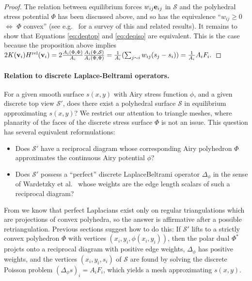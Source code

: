 \documentclass[annual]{acmsiggraph}
\def\rel{{\mathord{\text{\rm rel}}}}
\def\SS{{\mathcal S}}
\begin{document}
\begin{proof} The relation between equilibrium forces $w_{ij}{\mathbf e}_{ij}$ in
$\SS$ and the polyhedral stress potential $\Phi$ has been discussed above,
and so has the equivalence ``$w_{ij}\ge 0$ $\iff$ $\Phi$ convex'' (see
e.g.\ \cite{Ash1988} for a survey of this and related results). It remains
to show that Equations \eqref{eq:deqtop} and \eqref{eq:deqiso} are
equivalent. This is the case because the proposition above implies
	$
	2 K(\vw_i) H^\rel(\vw_i) =
	2 \frac{A_i(\Phi,\Phi)}{A_i}
	\frac{A_i(\Phi,\SS)}{A_i(\Phi,\Phi)} =
	{1\over A_i}
	(\sum_{j\sim i} w_{ij} (s_j-s_i))
	= {1\over A_i} A_i F_i.
	$
	\end{proof}

\paragraph{Relation to discrete Laplace-Beltrami operators.}

For a given smooth surface $s(x,y)$ with Airy stress function $\phi$, and 
a given discrete top view $\SS'$, does there exist a polyhedral surface 
$\SS$ in equilibrium approximating $s(x,y)$? We restrict our attention to 
triangle meshes, where planarity of the faces of the discrete stress 
surface $\Phi$ is not an issue.
This question has several equivalent reformulations:

\begin{itemize}\itemsep-\parsep

\item Does $\SS'$ have a reciprocal diagram whose corresponding
Airy polyhedron $\Phi$ approximates the continuous Airy potential $\phi$?

\item Does $\SS'$ possess a ``perfect'' discrete Laplace\dash Beltrami operator 
$\Delta_\phi$ in the sense of Wardetzky et al.~
whose weights are the edge length scalars of such a reciprocal diagram?

\end{itemize}

From \cite{wardetzky07} we know that perfect Laplacians exist only
on regular triangulations which are projections of convex polyhedra, so
the answer is affirmative after a possible re\dash triangulation. 
Previous sections suggest how to do this: If $\SS'$ lifts to a strictly
convex polyhedron $\Phi$ with vertices $(x_i,y_i,\phi(x_i,y_i))$,
then the polar dual
$\Phi^*$ projcts onto a reciprocal diagram with positive edge weights,
$\Delta_\phi$ has positive weights, and the vertices $(x_i,y_i,s_i)$ of $\SS$
are found by solving the discrete Poisson problem $(\Delta_\phi s)_i=A_iF_i$, 
which yields a mesh approximating $s(x,y)$.
\end{document}
